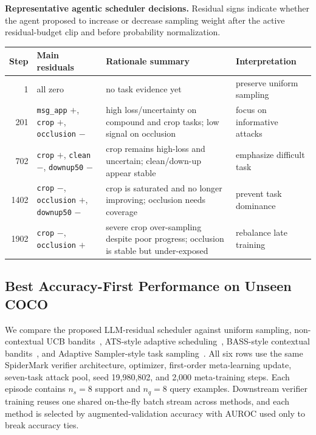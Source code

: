 \begin{table}[t]
\centering
\small
\textbf{Representative agentic scheduler decisions.}
Residual signs indicate whether the agent proposed to increase or decrease sampling weight after the active residual-budget clip and before probability normalization.
\vspace{0.4em}

\begin{tabular}{r p{} p{} p{}}
\toprule
\textbf{Step} & \textbf{Main residuals} & \textbf{Rationale summary} & \textbf{Interpretation} \\
\midrule
1 & all zero & no task evidence yet & preserve uniform sampling \\
201 & \texttt{msg\_app} $+$, \texttt{crop} $+$, \texttt{occlusion} $-$ & high loss/uncertainty on compound and crop tasks; low signal on occlusion & focus on informative attacks \\
702 & \texttt{crop} $+$, \texttt{clean} $-$, \texttt{downup50} $-$ & crop remains high-loss and uncertain; clean/down-up appear stable & emphasize difficult task \\
1402 & \texttt{crop} $-$, \texttt{occlusion} $+$, \texttt{downup50} $-$ & crop is saturated and no longer improving; occlusion needs coverage & prevent task dominance \\
1902 & \texttt{crop} $-$, \texttt{occlusion} $+$ & severe crop over-sampling despite poor progress; occlusion is stable but under-exposed & rebalance late training \\
\bottomrule
\end{tabular}
\end{table}

\subsection{Best Accuracy-First Performance on Unseen COCO}

We compare the proposed LLM-residual scheduler against uniform sampling, non-contextual UCB bandits~\cite{auer2002finite}, ATS-style adaptive scheduling~\cite{yao2021ats}, BASS-style contextual bandits~\cite{ban2023bass}, and Adaptive Sampler-style task sampling~\cite{wang2024tasksampler}.
All six rows use the same SpiderMark verifier architecture, optimizer, first-order meta-learning update, seven-task attack pool, seed 19,980,802, and 2,000 meta-training steps.
Each episode contains $n_s=8$ support and $n_q=8$ query examples.
Downstream verifier training reuses one shared on-the-fly batch stream across methods, and each method is selected by augmented-validation accuracy with AUROC used only to break accuracy ties.

